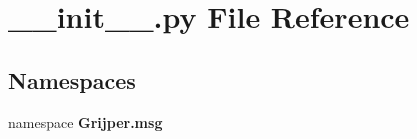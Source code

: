 \section{\-\_\-\-\_\-init\-\_\-\-\_\-.\-py File Reference}
\label{msg_2____init_____8py}
\subsection*{Namespaces}
\begin{DoxyCompactItemize}
\item 
namespace {\bf Grijper.\-msg}
\end{DoxyCompactItemize}
